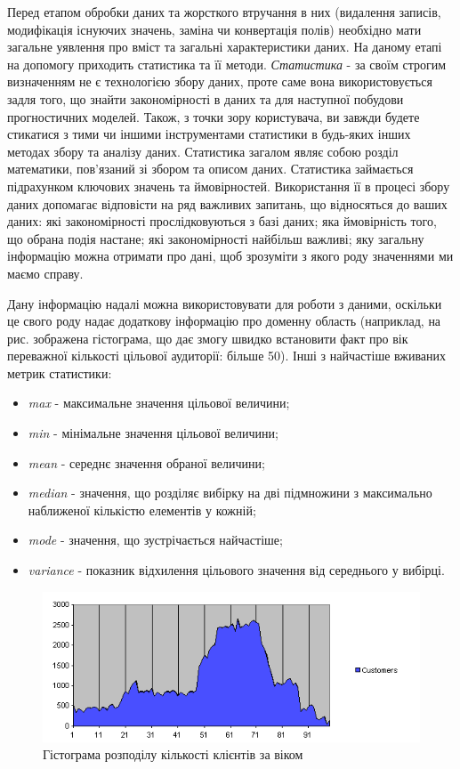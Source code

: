 Перед етапом обробки даних та жорсткого втручання в них (видалення записів, модифікація існуючих значень, заміна чи конвертація полів) необхідно мати загальне уявлення про вміст та загальні характеристики даних. На даному етапі на допомогу приходить статистика та її методи.
\textit{Статистика} - за своїм строгим визначенням не є технологією збору даних, проте саме вона використовується задля того, що знайти закономірності в даних та для наступної побудови прогностичних моделей. Також, з точки зору користувача, ви завжди будете стикатися з тими чи іншими інструментами статистики в будь-яких інших методах збору та аналізу даних. Статистика загалом являє собою розділ математики, пов'язаний зі збором та описом даних. Статистика займається підрахунком ключових значень та ймовірностей. Використання її в процесі збору даних допомагає відповісти на ряд важливих запитань, що відносяться до ваших даних: які закономірності прослідковуються з базі даних; яка ймовірність того, що обрана подія настане; які закономірності найбільш важливі; яку загальну інформацію можна отримати про дані, щоб зрозуміти з якого роду значеннями ми маємо справу.

Дану інформацію надалі можна використовувати для роботи з даними, оскільки це свого роду надає додаткову інформацію про доменну область (наприклад, на рис. зображена гістограма, що дає змогу швидко встановити факт про вік переважної кількості цільової аудиторії: більше 50). Інші з найчастіше вживаних метрик статистики:
\begin{itemize}
	\item \textit{max} - максимальне значення цільової величини;
	\item \textit{min} - мінімальне значення цільової величини;
	\item \textit{mean} - середнє значення обраної величини;
	\item \textit{median} - значення, що розділяє вибірку на дві підмножини з максимально наближеної кількістю елементів у кожній;
	\item \textit{mode} - значення, що зустрічається найчастіше;
	\item \textit{variance} - показник відхилення цільового значення від середнього у вибірці.
\end{itemize}

\begin{figure}[h!]
  \includegraphics[width=\linewidth]{figures/statistics.png}
  \caption{Гістограма розподілу кількості клієнтів за віком}
  \label{fig:statistics}
\end{figure}

